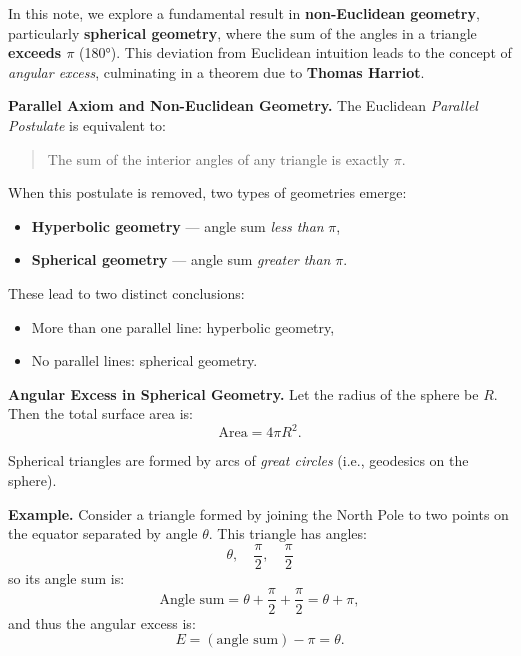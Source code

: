 \documentclass[11pt]{article}
\title{\LARGE \highlight{Thomas Harriot’s Theorem and Angular Excess in Spherical Geometry}}
\author{\large Ujjal Timshina}
\date{}
\newcommand{\highlight}[1]{\textcolor{myred}{\textbf{#1}}}
\begin{document}
\maketitle

\vspace{1em}

In this note, we explore a fundamental result in \highlight{non-Euclidean geometry}, particularly \highlight{spherical geometry}, where the sum of the angles in a triangle \highlight{exceeds \( \pi \)} (180°). This deviation from Euclidean intuition leads to the concept of \emph{angular excess}, culminating in a theorem due to \highlight{Thomas Harriot}.

\bigskip

\highlight{Parallel Axiom and Non-Euclidean Geometry.} The Euclidean \emph{Parallel Postulate} is equivalent to:

\begin{quote}
The sum of the interior angles of any triangle is exactly \( \pi \).
\end{quote}

When this postulate is removed, two types of geometries emerge:
\begin{itemize}
    \item \highlight{Hyperbolic geometry} — angle sum \textit{less than} \( \pi \),
    \item \highlight{Spherical geometry} — angle sum \textit{greater than} \( \pi \).
\end{itemize}

These lead to two distinct conclusions:
\begin{itemize}
    \item More than one parallel line: hyperbolic geometry,
    \item No parallel lines: spherical geometry.
\end{itemize}

\bigskip

\highlight{Angular Excess in Spherical Geometry.}  
Let the radius of the sphere be \( R \). Then the total surface area is:
\[
\text{Area} = 4\pi R^2.
\]

Spherical triangles are formed by arcs of \emph{great circles} (i.e., geodesics on the sphere).

\medskip

\highlight{Example.} Consider a triangle formed by joining the North Pole to two points on the equator separated by angle \( \theta \). This triangle has angles:
\[
\theta, \quad \frac{\pi}{2}, \quad \frac{\pi}{2}
\]
so its angle sum is:
\[
\text{Angle sum} = \theta + \frac{\pi}{2} + \frac{\pi}{2} = \theta + \pi,
\]
and thus the angular excess is:
\[
E = (\text{angle sum}) - \pi = \theta.
\]
\end{document}
